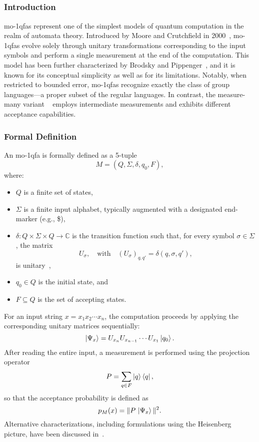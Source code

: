 \subsection{}
\label{sec:moqfa}

\subsubsection{Introduction}
\glspl{mo-1qfa} represent one of the simplest models of quantum computation in the realm of automata theory. Introduced by Moore and Crutchfield in 2000~\cite{moore2000quantum}, \glspl{mo-1qfa} evolve solely through unitary transformations corresponding to the input symbols and perform a single measurement at the end of the computation. This model has been further characterized by Brodsky and Pippenger~\cite{brodsky2002characterizations}, and it is known for its conceptual simplicity as well as for its limitations. Notably, when restricted to bounded error, \glspl{mo-1qfa} recognize exactly the class of group languages—a proper subset of the regular languages. In contrast, the measure-many variant ~\cite{kondacs1997power} employs intermediate measurements and exhibits different acceptance capabilities.

\subsubsection{Formal Definition}
An \gls{mo-1qfa} is formally defined as a 5-tuple 
\[
M = (Q,\Sigma,\delta,q_0,F),
\]
where:
\begin{itemize}
    \item $Q$ is a finite set of states,
    \item $\Sigma$ is a finite input alphabet, typically augmented with a designated end-marker (e.g., \$),
    \item $\delta : Q \times \Sigma \times Q \to \mathbb{C}$ is the transition function such that, for every symbol $\sigma\in\Sigma$, the matrix 
    \[
    U_\sigma,\quad \text{with} \quad (U_\sigma)_{q,q'} = \delta(q,\sigma,q'),
    \]
    is unitary~\cite{moore2000quantum},
    \item $q_0 \in Q$ is the initial state, and
    \item $F\subseteq Q$ is the set of accepting states.
\end{itemize}
For an input string $x=x_1x_2\cdots x_n$, the computation proceeds by applying the corresponding unitary matrices sequentially:
\[
\ket{\Psi_x} = U_{x_n}U_{x_{n-1}}\cdots U_{x_1}\ket{q_0}.
\]
After reading the entire input, a measurement is performed using the projection operator
\[
P=\sum_{q\in F} \ket{q}\bra{q},
\]
so that the acceptance probability is defined as
\[
p_M(x)=\|P\,\ket{\Psi_x}\|^2.
\]
Alternative characterizations, including formulations using the Heisenberg picture, have been discussed in~\cite{qiu2004characterizations,piazza2022mirrors}.

